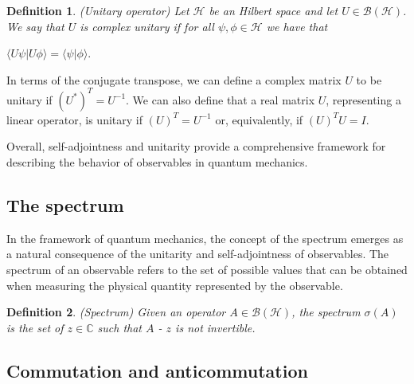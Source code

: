 \documentclass{Configuration_Files/PoliMi3i_thesis}
\newtheorem{definition}{Definition}[chapter]
\begin{document}
\begin{definition} (Unitary operator) Let $\mathscr{H}$ be an Hilbert space and let $U \in \mathscr{B}(\mathscr{H})$. We say that $U$ is complex unitary if for all $\psi,\phi \in \mathscr{H}$ we have that
\end{definition}

\begin{center}
	$\langle U\psi|U\phi \rangle = \langle \psi|\phi \rangle$.
\end{center}

In terms of the conjugate transpose, we can define a complex matrix $U$ to be unitary if $ (U^*)^T=U^{-1}$. We can also define that a real matrix $U$, representing a linear operator, is unitary if $(U)^T = U^{-1}$ or, equivalently, if $(U)^T U=I$. 

Overall, self-adjointness and unitarity provide a comprehensive framework for describing the behavior of observables in quantum mechanics.


\subsection{The spectrum}

In the framework of quantum mechanics, the concept of the spectrum emerges as a natural consequence of the unitarity and self-adjointness of observables. The spectrum of an observable refers to the set of possible values that can be obtained when measuring the physical quantity represented by the observable. 

\begin{definition}(Spectrum)
	Given an operator $A\in\mathscr{B(\mathscr{H})}$, the spectrum $\sigma(A)$ is the set of $z\in\mathbb{C}$ such that $A$ - $z$ is not invertible.
\end{definition}



\subsection{Commutation and anticommutation}
\end{document}
